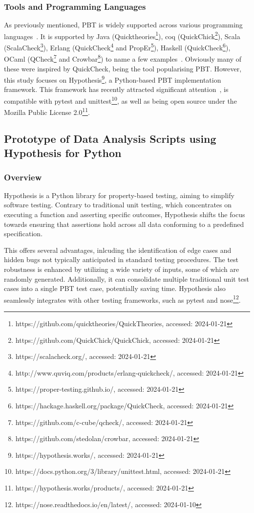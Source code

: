 \documentclass[runningheads]{llncs}
\begin{document}
\subsubsection{Tools and Programming Languages}
As previously mentioned, PBT is widely supported across various programming languages~\cite{Chen2022,Shi2023}. It is supported by Java (Quicktheories\footnote{https://github.com/quicktheories/QuickTheories, accessed: 2024-01-21}), coq (QuickChick\footnote{https://github.com/QuickChick/QuickChick, accessed: 2024-01-21}), Scala (ScalaCheck\footnote{https://scalacheck.org/, accessed: 2024-01-21}), Erlang (QuickCheck\footnote{http://www.quviq.com/products/erlang-quickcheck/, accessed: 2024-01-21} and PropEr\footnote{https://proper-testing.github.io/, accessed: 2024-01-21}), Haskell (QuickCheck\footnote{https://hackage.haskell.org/package/QuickCheck, accessed: 2024-01-21}), OCaml (QCheck\footnote{https://github.com/c-cube/qcheck/, accessed: 2024-01-21} and Crowbar\footnote{https://github.com/stedolan/crowbar, accessed: 2024-01-21}) to name a few examples~\cite{MacIver2016,Padhye2019,Paraskevopoulou2015,Arts2008,Papadakis2011,Claessen2000}. Obviously many of these were inspired by QuickCheck, being the tool popularising PBT. However, this study focuses on Hypothesis\footnote{https://hypothesis.works/, accessed: 2024-01-21}, a Python-based PBT implementation framework. This framework has recently attracted significant attention~\cite{Corgozinho2023,MacIver2019}, is compatible with pytest and unittest\footnote{https://docs.python.org/3/library/unittest.html, accessed: 2024-01-21}, as well as being open source under the Mozilla Public License 2.0\footnote{https://hypothesis.works/products/, accessed: 2024-01-21}.

\subsection{Prototype of Data Analysis Scripts using Hypothesis for Python}
\subsubsection{Overview}
Hypothesis is a Python library for property-based testing, aiming to simplify software testing. Contrary to traditional unit testing, which concentrates on executing a function and asserting specific outcomes, Hypothesis shifts the focus towards ensuring that assertions hold across all data conforming to a predefined specification.

This offers several advantages, inlcuding the identification of edge cases and hidden bugs not typically anticipated in standard testing procedures. The test robustness is enhanced by utilizing a wide variety of inputs, some of which are randomly generated. Additionally, it can consolidate multiple traditional unit test cases into a single PBT test case, potentially saving time. Hypothesis also seamlessly integrates with other testing frameworks, such as pytest and nose\footnote{https://nose.readthedocs.io/en/latest/, accessed: 2024-01-10}.
\end{document}
